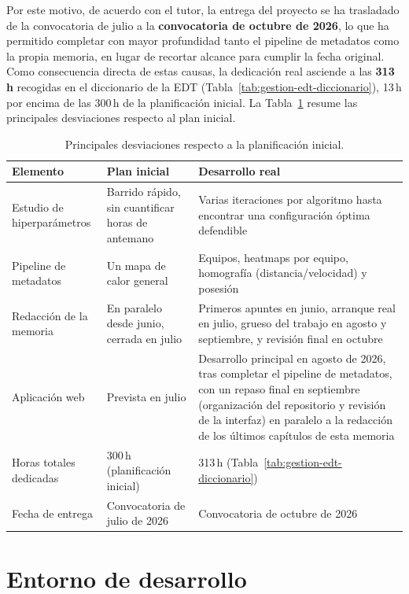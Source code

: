 Por este motivo, de acuerdo con el tutor, la entrega del proyecto se ha
trasladado de la convocatoria de julio a la \textbf{convocatoria de
octubre de 2026}, lo que ha permitido completar con mayor profundidad tanto
el pipeline de metadatos como la propia memoria, en lugar de recortar
alcance para cumplir la fecha original. Como consecuencia directa de estas
causas, la dedicación real asciende a las \textbf{313\,h} recogidas en el
diccionario de la EDT (Tabla~\ref{tab:gestion-edt-diccionario}), 13\,h por
encima de las 300\,h de la planificación inicial. La
Tabla~\ref{tab:gestion-desviaciones} resume las principales desviaciones
respecto al plan inicial.

\begin{table}[htp]
\centering
\caption{Principales desviaciones respecto a la planificación inicial.}
\label{tab:gestion-desviaciones}
\renewcommand{\arraystretch}{1.3}
\begin{tabular}{|p{2.6cm}|p{4.6cm}|p{4.8cm}|}
\hline
\rowcolor{gray!25}
\textbf{Elemento} & \textbf{Plan inicial} & \textbf{Desarrollo real} \\
\hline
Estudio de hiperparámetros & Barrido rápido, sin cuantificar horas de
  antemano & Varias iteraciones por algoritmo hasta encontrar una
  configuración óptima defendible \\
\hline
Pipeline de metadatos & Un mapa de calor general & Equipos, heatmaps por
  equipo, homografía (distancia/velocidad) y posesión \\
\hline
Redacción de la memoria & En paralelo desde junio, cerrada en julio &
  Primeros apuntes en junio, arranque real en julio, grueso del trabajo
  en agosto y septiembre, y revisión final en octubre \\
\hline
Aplicación web & Prevista en julio & Desarrollo principal en agosto de
  2026, tras completar el pipeline de metadatos, con un repaso final en
  septiembre (organización del repositorio y revisión de la interfaz) en
  paralelo a la redacción de los últimos capítulos de esta memoria \\
\hline
Horas totales dedicadas & 300\,h (planificación inicial) & 313\,h
  (Tabla~\ref{tab:gestion-edt-diccionario}) \\
\hline
Fecha de entrega & Convocatoria de julio de 2026 & Convocatoria de
  octubre de 2026 \\
\hline
\end{tabular}
\end{table}

\section{Entorno de desarrollo}
\label{sec:gestion-entorno}

